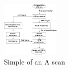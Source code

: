 \documentclass[conference]{IEEEtran}
\begin{document}
 \begin{figure}
\centering
\label{figure:ScanA}
\includegraphics[width=0.25\textwidth]{images/BlockDiagram.jpg}
 \caption{Simple of an A scan }
\end{figure}


\end{document}
